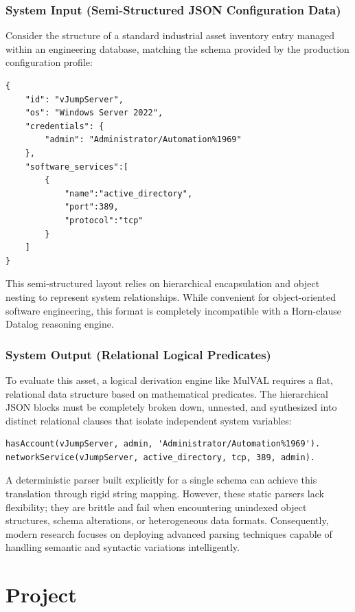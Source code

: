 \documentclass[target=mst,aauheader=aics,style=]{thud}
\begin{document}
\subsection{System Input (Semi-Structured JSON Configuration Data)}
Consider the structure of a standard industrial asset inventory entry managed within an engineering database, matching the schema provided by the production configuration profile:
\begin{verbatim}
{
    "id": "vJumpServer",
    "os": "Windows Server 2022",
    "credentials": {
        "admin": "Administrator/Automation%1969"
    },
    "software_services":[
        {
            "name":"active_directory", 
            "port":389, 
            "protocol":"tcp"
        }
    ]
}
\end{verbatim}
This semi-structured layout relies on hierarchical encapsulation and object nesting to represent system relationships. While convenient for object-oriented software engineering, this format is completely incompatible with a Horn-clause Datalog reasoning engine.

\subsection{System Output (Relational Logical Predicates)}
To evaluate this asset, a logical derivation engine like MulVAL requires a flat, relational data structure based on mathematical predicates. The hierarchical JSON blocks must be completely broken down, unnested, and synthesized into distinct relational clauses that isolate independent system variables:
\begin{verbatim}
hasAccount(vJumpServer, admin, 'Administrator/Automation%1969').
networkService(vJumpServer, active_directory, tcp, 389, admin).
\end{verbatim}

A deterministic parser built explicitly for a single schema can achieve this translation through rigid string mapping. However, these static parsers lack flexibility; they are brittle and fail when encountering unindexed object structures, schema alterations, or heterogeneous data formats. Consequently, modern research focuses on deploying advanced parsing techniques capable of handling semantic and syntactic variations intelligently.


\chapter{Project}
\end{document}
